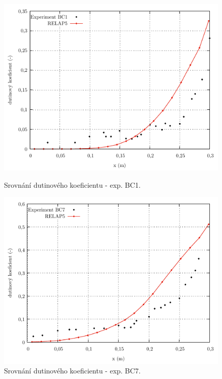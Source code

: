 \begin{figure}[p]
	\centering
	\begin{minipage}{.5\textwidth}
		\centering
		\includegraphics[width=\linewidth]{./03_benchmark/grafy/srovnani_exp1.pdf}
		\caption{Srovnání dutinového koeficientu - exp. BC1.}
		\label{fig:zeitoun_bc1}
	\end{minipage}%
	\begin{minipage}{.5\textwidth}
		\centering
		\includegraphics[width=\linewidth]{./03_benchmark/grafy/srovnani_exp2.pdf}
		\caption{Srovnání dutinového koeficientu - exp. BC7.}
		\label{fig:zeitoun_bc7}
	\end{minipage}
\end{figure}

